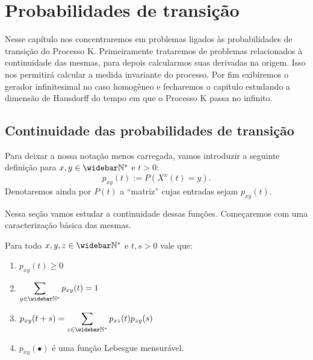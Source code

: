 \chapter{Probabilidades de transição}
\label{cap:taxas}

Nesse capítulo nos concentraremos em problemas ligados às
probabilidades de transição do Processo K. Primeiramente trataremos de
problemas relacionados à continuidade das mesmas, para depois
calcularmos suas derivadas na origem. Isso nos permitirá calcular a
medida invariante do processo.  Por fim exibiremos o gerador
infinitesimal no caso homogêneo e fecharemos o capítulo estudando a
dimensão de Hausdorff do tempo em que o Processo K passa no infinito.


\section{Continuidade das probabilidades de transição}
\label{sec:continuidade}

Para deixar a nossa notação menos carregada, vamos introduzir a
seguinte definição para $x, y \in \Nzb$ e $t > 0$:
\begin{displaymath}
  p_{xy} (t) := P(X^x(t) = y).
\end{displaymath}
Denotaremos ainda por $P(t)$ a ``matriz'' cujas entradas sejam $p_{xy}(t)$.

Nessa seção vamos estudar a continuidade dessas funções. Começaremos
com uma caracterização básica das mesmas.

\begin{proposicao}
  \label{prop:transicao-mensuravel}
  Para todo $x, y, z \in \Nzb$ e $t, s > 0$ vale que:
  \begin{enumerate}
  \item $p_{xy}(t) \geq 0$
  \item $\displaystyle \sum_{y \in \Nzb} p_{xy}(t) = 1$
  \item $\displaystyle p_{xy}(t+s) = \sum_{z\in\Nzb}p_{xz}(t)p_{zy}(s)$
  \item $p_{xy}(\bullet)$ é uma função Lebesgue mensurável.
  \end{enumerate}
\end{proposicao}

